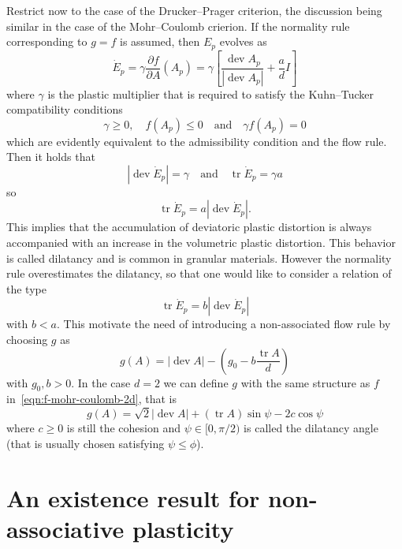 \documentclass[a4paper,10pt,oneside]{amsbook}
\numberwithin{section}{chapter}
\numberwithin{equation}{chapter}
\theoremstyle{definition}
\DeclareMathOperator{\dev}{dev}
\DeclareMathOperator{\tr}{tr}
\newcommand{\dind}[2]{\frac{\partial #1}{\partial #2}}
\begin{document}
Restrict now to the case of the Drucker--Prager criterion, the discussion being similar in the case of the Mohr--Coulomb crierion. If the normality rule corresponding to $g=f$ is assumed, then $E_p$ evolves as
\[
\dot E_p=\gamma\dind{f}{A}(A_p)=\gamma\left[\frac{\dev A_p}{|\dev A_p|}+\frac{a}{d}I\right]
\]
where $\gamma$ is the plastic multiplier that is required to satisfy the Kuhn--Tucker compatibility conditions
\[
\gamma\ge0,\quad f(A_p)\le0\quad\text{and}\quad\gamma f(A_p)=0
\]
which are evidently equivalent to the admissibility condition and the flow rule. Then it holds that
\[
|\dev\dot E_p|=\gamma\quad\text{and}\quad\tr\dot E_p=\gamma a
\]
so
\[
\tr\dot E_p=a|\dev\dot E_p|.
\]
This implies that the accumulation of deviatoric plastic distortion is always accompanied with an increase in the volumetric plastic distortion. This behavior is called dilatancy and is common in granular materials. However the normality rule overestimates the dilatancy, so that one would like to consider a relation of the type
\[
\tr\dot E_p=b|\dev\dot E_p|
\]
with $b<a$. This motivate the need of introducing a non-associated flow rule by choosing $g$ as
\begin{equation}
\label{eqn:g}
g(A)=|\dev A|-\left(g_0-b\frac{\tr A}{d}\right)
\end{equation}
with $g_0,b>0$. In the case $d=2$ we can define $g$ with the same structure as $f$ in~\eqref{eqn:f-mohr-coulomb-2d}, that is
\[
g(A)=\sqrt{2}|\dev A|+(\tr A)\sin\psi-2c\cos\psi
\]
where $c\ge0$ is still the cohesion and $\psi\in[0,\pi/2)$ is called the dilatancy angle (that is usually chosen satisfying $\psi\le\phi$).

\section{An existence result for non-associative plasticity}
\end{document}
